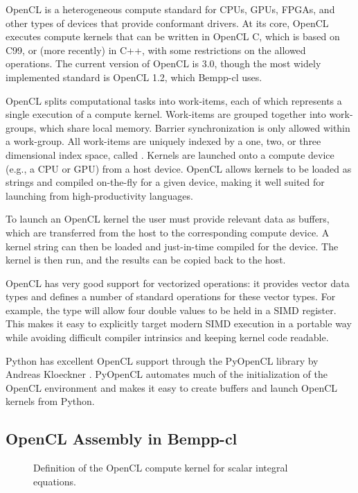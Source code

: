 \documentclass{IEEEcsmag}
\begin{document}
OpenCL \cite{opencl} is a heterogeneous compute standard for CPUs, GPUs, FPGAs, and other types of devices that provide conformant drivers. At its core, OpenCL executes compute kernels that can be written in OpenCL C, which is based on C99, or (more recently) in C++, with some restrictions on the allowed operations. The current version of OpenCL is 3.0, though the most widely implemented standard is OpenCL 1.2, which Bempp-cl uses.

OpenCL splits computational tasks into work-items, each of which represents a single execution of a compute kernel. Work-items are grouped together into work-groups, which share local memory. Barrier synchronization is only allowed within a work-group. All work-items are uniquely indexed by a one, two, or three dimensional index space, called . Kernels are launched onto a compute device (e.g., a CPU or GPU) from a host device. OpenCL allows kernels to be loaded as strings and compiled on-the-fly for a given device, making it well suited for launching from high-productivity languages.

To launch an OpenCL kernel the user must provide relevant data as buffers, which are transferred from the host to the corresponding compute device. A kernel string can then be loaded and just-in-time compiled for the device. The kernel is then run, and the results can be copied back to the host.

OpenCL has very good support for vectorized operations: it provides vector data types and defines a number of standard operations for these vector types. For example, the type \mbox{} will allow four double values to be held in a SIMD register. This makes it easy to explicitly target modern SIMD execution in a portable way while avoiding difficult compiler intrinsics and keeping kernel code readable.

Python has excellent OpenCL support through the PyOpenCL library by Andreas Kloeckner \cite{pyopencl}. PyOpenCL automates much of the initialization of the OpenCL environment and makes it easy to create buffers and launch OpenCL kernels from Python.

\subsection{OpenCL Assembly in Bempp-cl}

\begin{figure}
	\center
	
	\caption{Definition of the OpenCL compute kernel for scalar integral equations.}
	\label{fig:kernel_definition}
\end{figure}
\end{document}
